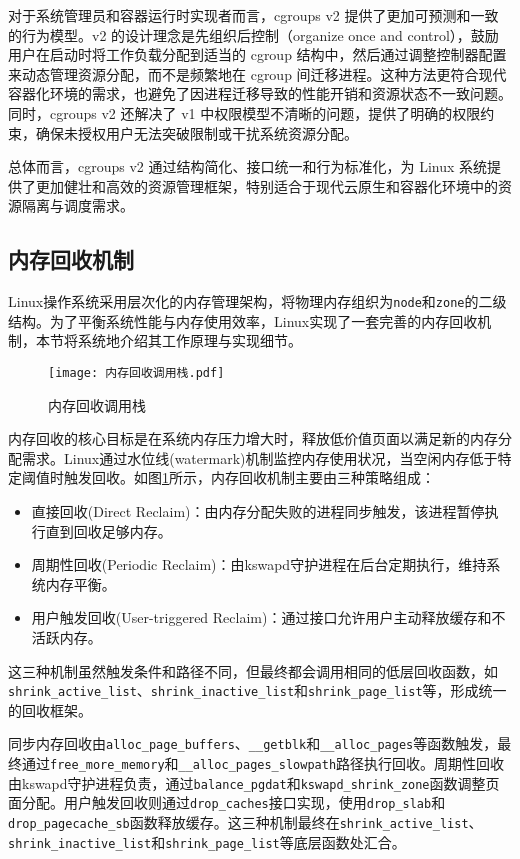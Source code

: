 对于系统管理员和容器运行时实现者而言，cgroups v2 提供了更加可预测和一致的行为模型。v2 的设计理念是先组织后控制（organize once and control），鼓励用户在启动时将工作负载分配到适当的 cgroup 结构中，然后通过调整控制器配置来动态管理资源分配，而不是频繁地在 cgroup 间迁移进程。这种方法更符合现代容器化环境的需求，也避免了因进程迁移导致的性能开销和资源状态不一致问题。同时，cgroups v2 还解决了 v1 中权限模型不清晰的问题，提供了明确的权限约束，确保未授权用户无法突破限制或干扰系统资源分配。

总体而言，cgroups v2 通过结构简化、接口统一和行为标准化，为 Linux 系统提供了更加健壮和高效的资源管理框架，特别适合于现代云原生和容器化环境中的资源隔离与调度需求。

\subsection{内存回收机制}
\label{sec:Linux内存回收机制}

Linux操作系统采用层次化的内存管理架构，将物理内存组织为\texttt{node}和\texttt{zone}的二级结构。为了平衡系统性能与内存使用效率，Linux实现了一套完善的内存回收机制，本节将系统地介绍其工作原理与实现细节。

\begin{figure}[h]
    \centering
    \texttt{[image: 内存回收调用栈.pdf]}
    \caption{内存回收调用栈}
    \label{fig:memory_reclaim_callgraph}
\end{figure}


内存回收的核心目标是在系统内存压力增大时，释放低价值页面以满足新的内存分配需求。Linux通过水位线(watermark)机制监控内存使用状况，当空闲内存低于特定阈值时触发回收。如图\ref{fig:memory_reclaim_callgraph}所示，内存回收机制主要由三种策略组成：

\begin{itemize}
    \item 直接回收(Direct Reclaim)：由内存分配失败的进程同步触发，该进程暂停执行直到回收足够内存。
    \item 周期性回收(Periodic Reclaim)：由kswapd守护进程在后台定期执行，维持系统内存平衡。
    \item 用户触发回收(User-triggered Reclaim)：通过接口允许用户主动释放缓存和不活跃内存。
\end{itemize}

这三种机制虽然触发条件和路径不同，但最终都会调用相同的低层回收函数，如\texttt{shrink\_active\_list}、\texttt{shrink\_inactive\_list}和\texttt{shrink\_page\_list}等，形成统一的回收框架。

同步内存回收由\texttt{alloc\_page\_buffers}、\texttt{\_\_getblk}和\texttt{\_\_alloc\_pages}等函数触发，最终通过\texttt{free\_more\_memory}和\texttt{\_\_alloc\_pages\_slowpath}路径执行回收。周期性回收由kswapd守护进程负责，通过\texttt{balance\_pgdat}和\allowbreak \texttt{kswapd\_shrink\_zone}函数调整页面分配。用户触发回收则通过\texttt{drop\_caches}接口实现，使用\texttt{drop\_slab}和\texttt{drop\_pagecache\_sb}函数释放缓存。这三种机制最终在\texttt{shrink\_active\_list}、\texttt{shrink\_inactive\_list}和\texttt{shrink\_page\_list}等底层函数处汇合。

